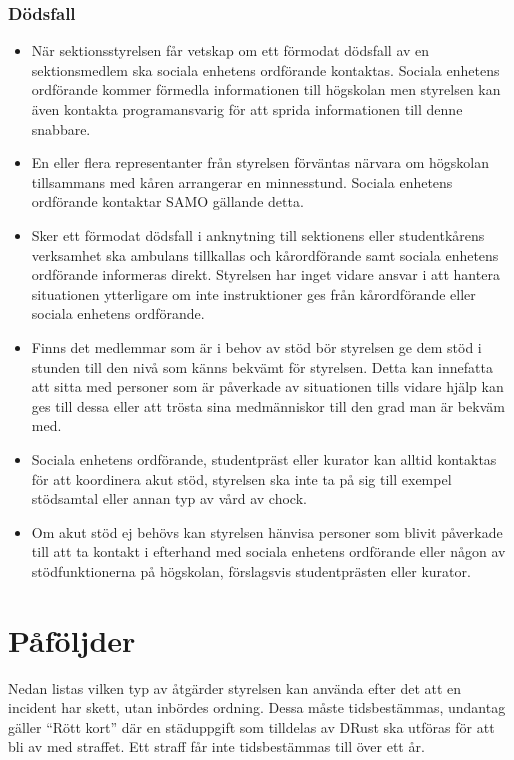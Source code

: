 \documentclass{dtek}
\begin{document}
\subsubsection{Dödsfall}
\begin{itemize}
    \item När sektionsstyrelsen får vetskap om ett förmodat dödsfall av en sektionsmedlem ska sociala  enhetens ordförande kontaktas. Sociala enhetens ordförande kommer förmedla  informationen till högskolan men styrelsen kan även kontakta programansvarig för att sprida  informationen till denne snabbare.
    \item En eller flera representanter från styrelsen förväntas närvara om högskolan tillsammans med kåren arrangerar en minnesstund. Sociala enhetens ordförande kontaktar SAMO gällande detta.
    \item Sker ett förmodat dödsfall i anknytning till sektionens eller studentkårens verksamhet ska ambulans tillkallas och kårordförande samt sociala enhetens ordförande informeras direkt. Styrelsen har inget vidare ansvar i att hantera situationen ytterligare om inte instruktioner ges från  kårordförande eller sociala enhetens ordförande.
    \item Finns det medlemmar som är i behov av stöd bör styrelsen ge dem stöd i stunden till den nivå  som känns bekvämt för styrelsen. Detta kan innefatta att sitta med personer som är  påverkade av situationen tills vidare hjälp kan ges till dessa eller att trösta sina medmänniskor till den grad man är bekväm med.
    \item Sociala enhetens ordförande, studentpräst eller kurator kan alltid kontaktas för att koordinera akut stöd, styrelsen ska inte ta på sig till exempel stödsamtal eller annan typ av vård av chock.
    \item Om akut stöd ej behövs kan styrelsen hänvisa personer som blivit påverkade till att ta kontakt i efterhand med sociala enhetens ordförande eller någon av stödfunktionerna på högskolan, förslagsvis studentprästen eller kurator.  
\end{itemize}

\section{Påföljder}
Nedan listas vilken typ av åtgärder styrelsen kan använda efter det att en incident har skett, utan inbördes ordning. Dessa måste tidsbestämmas, undantag gäller ``Rött kort'' där en städuppgift som tilldelas av DRust ska utföras för att bli av med straffet. Ett straff får inte tidsbestämmas till över ett år.
\end{document}
